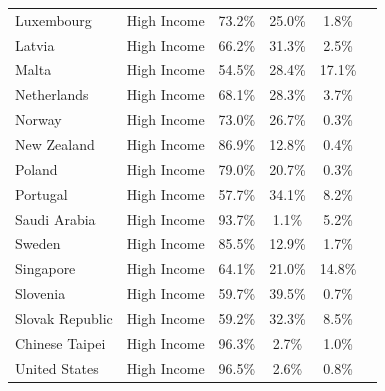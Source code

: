 \begin{center}
{\begin{tabular}{lccc@{\hskip 0.55in}cc}
			Luxembourg & High Income & 73.2\% & 25.0\% & 1.8\% \\
			Latvia & High Income & 66.2\% & 31.3\% & 2.5\% \\
			Malta & High Income & 54.5\% & 28.4\% & 17.1\% \\
			Netherlands & High Income & 68.1\% & 28.3\% & 3.7\% \\
			Norway & High Income & 73.0\% & 26.7\% & 0.3\% \\
			New Zealand & High Income & 86.9\% & 12.8\% & 0.4\% \\
			Poland & High Income & 79.0\% & 20.7\% & 0.3\% \\
			Portugal & High Income & 57.7\% & 34.1\% & 8.2\% \\
			Saudi Arabia & High Income & 93.7\% & 1.1\% & 5.2\% \\
			Sweden & High Income & 85.5\% & 12.9\% & 1.7\% \\
			Singapore & High Income & 64.1\% & 21.0\% & 14.8\% \\
			Slovenia & High Income & 59.7\% & 39.5\% & 0.7\% \\
			Slovak Republic & High Income & 59.2\% & 32.3\% & 8.5\% \\
			Chinese Taipei & High Income & 96.3\% & 2.7\% & 1.0\% \\
			United States & High Income & 96.5\% & 2.6\% & 0.8\% \\
			\toprule
	\end{tabular}}
\end{center}
